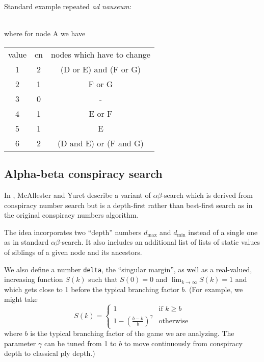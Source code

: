 \documentclass[10pt,dvipdfmx,letterpaper]{report}
\newcommand{\ab}{{$\alpha\beta$}}
\begin{document}
Standard example repeated {\it ad nauseum}:
\begin{center}
\\\noindent
where for node A we have
\\\noindent
\begin{tabular}{ccc}
  value & cn & nodes which have to change \\
  1 & 2 & (D or E) and (F or G) \\
  2 & 1 & F or G \\
  3 & 0 & - \\
  4 & 1 & E or F \\
  5 & 1 & E \\
  6 & 2 & (D and E) or (F and G)
\end{tabular}
\end{center}

\subsection{Alpha-beta conspiracy search}

In \cite{alphabetaconspiracy}, McAllester and Yuret describe a variant of \ab-search
which is derived from conspiracy number search but is a depth-first rather than best-first search
as in the original conspiracy numbers algorithm.

The idea incorporates two ``depth'' numbers $d_{\max}$ and $d_{\min}$ instead of a single one as in
standard \ab-search.  It also includes an additional list of lists of static values of siblings of
a given node and its ancestors.

We also define a number \verb|delta|, the ``singular margin'', as well as a real-valued, increasing function
$S(k)$ such that $S(0)=0$ and $\lim_{k\to\infty}S(k)=1$ and which gets close to 1 before the typical
branching factor $b$.  (For example, we might take
\[ S(k) = \begin{cases}1&\text{if $k\geq b$}\\1-\left(\frac{b-k}{b}\right)^\gamma&\text{otherwise}\end{cases}\]
where $b$ is the typical branching factor of the game we are analyzing.
The parameter $\gamma$ can be tuned from 1 to $b$ to move continuously from conspiracy depth to classical
ply depth.)
\end{document}
